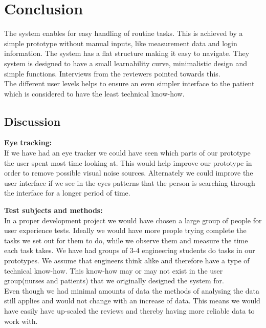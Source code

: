 \chapter{Conclusion}
The system enables for easy handling of routine tasks. This is achieved by a simple prototype without manual inputs, like measurement data and login information. The system has a flat structure making it easy to navigate. They system is designed to have a small learnability curve, minimalistic design and simple functions. Interviews from the reviewers pointed towards this.\\
The different user levels helps to ensure an even simpler interface to the patient which is considered to have the least technical know-how.\\

\section{Discussion}
\textbf{Eye tracking:}\\
If we have had an eye tracker we could have seen which parts of our prototype the user spent most time looking at. This would help improve our prototype in order to remove possible visual noise sources. Alternately we could improve the user interface if we see in the eyes patterns that the person is searching through the interface for a longer period of time. 

\textbf{Test subjects and methods:}\\
In a proper development project we would have chosen a large group of people for user experience tests. Ideally we would have more people trying complete the tasks we set out for them to do, while we observe them and measure the time each task takes.  We have had groups  of 3-4 engineering students do tasks in our prototypes. We assume that engineers think alike and therefore have a type of technical know-how. This know-how may or may not exist in the user group(nurses and patients) that we originally designed the system for.\\
Even though we had minimal amounts of data the methods of analysing the data still applies and would not change with an increase of data. This means we would have easily have up-scaled the reviews and thereby having more reliable data to work with.
